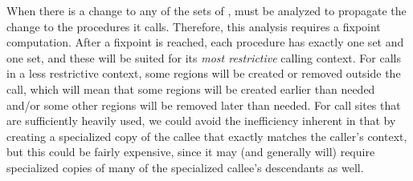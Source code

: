 \documentclass{tlp}
\begin{document}
When there is a change to any of the sets of ,
 must be analyzed to propagate the change to the procedures it calls.
Therefore, this analysis requires a fixpoint computation.
After a fixpoint is reached,
each procedure has exactly one  set and one  set,
and these will be suited for its \emph{most restrictive} calling context.
For calls in a less restrictive context,
some regions will be created or removed outside the call,
which will mean that
some regions will be created earlier than needed and/or
some other regions will be removed later than needed.
For call sites that are sufficiently heavily used,
we could avoid the inefficiency inherent in that
by creating a specialized copy of the callee
that exactly matches the caller's context,
but this could be fairly expensive,
since it may (and generally will) require
specialized copies of many of the specialized callee's descendants as well.
\end{document}
